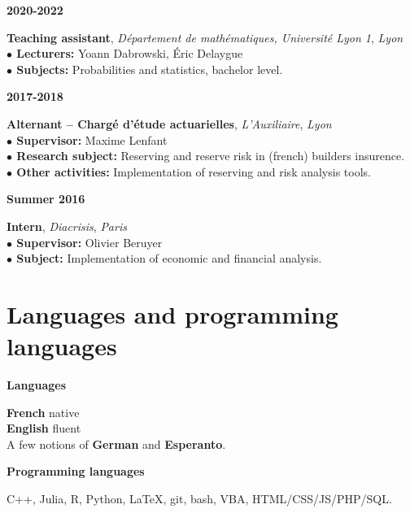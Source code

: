 \documentclass[a4paper,11pt]{article}
\newcommand{\tabcv}[2]{
\begin{minipage}[t]{0.12\linewidth}
\textbf{\footnotesize #1}
\end{minipage}\hfill
\begin{minipage}[t]{0.85\linewidth}
#2
\end{minipage}
\vspace{1em}
}
\begin{document}
\begin{flushleft}
\tabcv{2020-2022}{
\textbf{Teaching assistant}, \textit{Département de mathématiques, Université Lyon 1}, \textit{Lyon}\\[0.5em]
{\footnotesize
\textbf{$\bullet$ Lecturers:} Yoann Dabrowski, Éric Delaygue\\
\textbf{$\bullet$ Subjects:} Probabilities and statistics, bachelor level.\\
}
}

\tabcv{2017-2018}{
\textbf{Alternant -- Chargé d'étude actuarielles}, \textit{L'Auxiliaire}, \textit{Lyon}\\[0.5em]
{\footnotesize
\textbf{$\bullet$ Supervisor:} Maxime Lenfant\\
\textbf{$\bullet$ Research subject:} Reserving and reserve risk in (french) builders insurence.\\
\textbf{$\bullet$ Other activities:} Implementation of reserving and risk analysis tools.\\
}
}


\tabcv{Summer 2016}{
\textbf{Intern}, \textit{Diacrisis}, \textit{Paris}\\[0.5em]
{\footnotesize
\textbf{$\bullet$ Supervisor:} Olivier Beruyer\\
\textbf{$\bullet$ Subject:} Implementation of economic and financial analysis. \\
}
}

\end{flushleft}

\section{Languages and programming languages}
\tabcv{Languages}{
\textbf{French} native\\ 
\textbf{English} fluent\\ 
A few notions of \textbf{German} and \textbf{Esperanto}.\\
}
\tabcv{Programming languages}{
C++, Julia, R, Python, \LaTeX, git, bash, VBA, HTML/CSS/JS/PHP/SQL.\\
}
\end{document}
